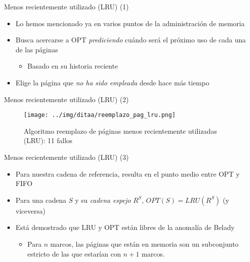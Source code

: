 \documentclass[presentation]{beamer}
\begin{document}
\begin{frame}[label={sec:orgcb08f99}]{Menos recientemente utilizado (LRU) (1)}
\begin{itemize}
\item Lo hemos mencionado ya en varios puntos de la administración de memoria
\item Busca acercarse a OPT \emph{prediciendo} cuándo será el próximo uso de
cada una de las páginas
\begin{itemize}
\item Basado en su historia reciente
\end{itemize}
\item Elige la página que \emph{no ha sido empleada} desde hace más tiempo
\end{itemize}
\end{frame}

\begin{frame}[label={sec:orgb709175}]{Menos recientemente utilizado (LRU) (2)}
\begin{figure}[htbp]
\centering
\texttt{[image: ../img/ditaa/reemplazo\_pag\_lru.png]}
\caption{Algoritmo reemplazo de páginas menos recientemente utilizadas (LRU): 11 fallos}
\end{figure}
\end{frame}

\begin{frame}[label={sec:orgc8829f8}]{Menos recientemente utilizado (LRU) (3)}
\begin{itemize}
\item Para nuestra cadena de referencia, resulta en el punto medio entre
OPT y FIFO
\item Para una cadena \(S\) y su \emph{cadena espejo} \(R^S\), \(OPT(S) = LRU(R^S)\)
(y viceversa)
\item Está demostrado que LRU y OPT están libres de la anomalía de Belady
\begin{itemize}
\item Para \(n\) marcos, las páginas que están en memoria son un
subconjunto estricto de las que estarían con \(n+1\) marcos.
\end{itemize}
\end{itemize}
\end{frame}
\end{document}

